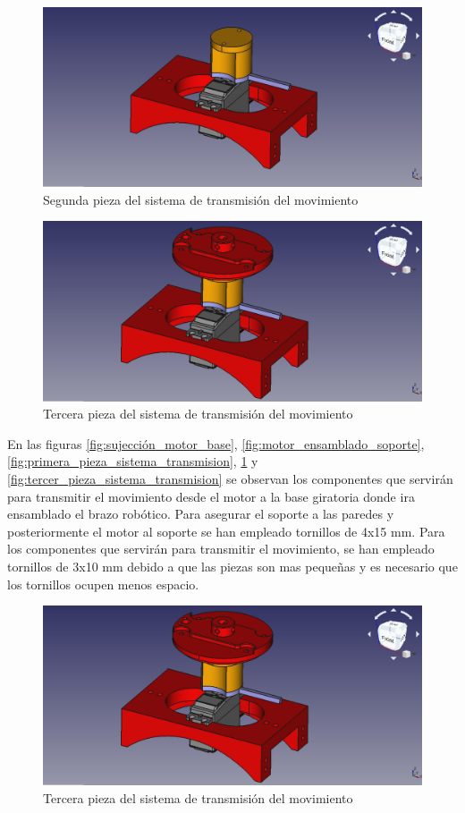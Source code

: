 \begin{figure}[H]
    \centering 
    \includegraphics[width=1\linewidth]{pictures/MotorMasSegundaPieza.png}
    \caption{Segunda pieza del sistema de transmisión del movimiento}
    \label{fig:segunda_pieza_sistema_transmision}
\end{figure}

\begin{figure}[H]
    \centering 
    \includegraphics[width=1\linewidth]{pictures/MotorMasTerceraPieza.png}
    \caption{Tercera pieza del sistema de transmisión del movimiento}
    \label{fig:tercera_pieza_sistema_transmision}
\end{figure}

En las figuras \ref{fig:sujección_motor_base}, \ref{fig:motor_ensamblado_soporte}, \ref{fig:primera_pieza_sistema_transmision},
\ref{fig:segunda_pieza_sistema_transmision} y
\ref{fig:tercer_pieza_sistema_transmision} se observan los componentes que servirán para transmitir el movimiento desde el motor a la base giratoria donde ira ensamblado el brazo robótico. Para asegurar el soporte a las paredes y posteriormente el motor al soporte se han empleado tornillos de 4x15 mm. Para los componentes que servirán para transmitir el movimiento, se han empleado tornillos de 3x10 mm debido a que las piezas son mas pequeñas y es necesario que los tornillos ocupen menos espacio.

\begin{figure}[H]
    \centering 
    \includegraphics[width=1\linewidth]{pictures/MotorMasTerceraPieza.png}
    \caption{Tercera pieza del sistema de transmisión del movimiento}
    \label{fig:tercera_pieza_sistema_transmision}
\end{figure}